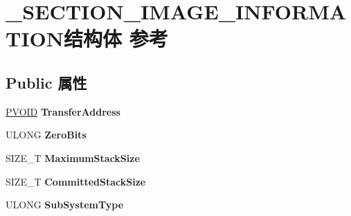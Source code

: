 \hypertarget{struct___s_e_c_t_i_o_n___i_m_a_g_e___i_n_f_o_r_m_a_t_i_o_n}{}\section{\+\_\+\+S\+E\+C\+T\+I\+O\+N\+\_\+\+I\+M\+A\+G\+E\+\_\+\+I\+N\+F\+O\+R\+M\+A\+T\+I\+O\+N结构体 参考}
\label{struct___s_e_c_t_i_o_n___i_m_a_g_e___i_n_f_o_r_m_a_t_i_o_n}
\subsection*{Public 属性}
\begin{DoxyCompactItemize}
\item 
\mbox{\label{struct___s_e_c_t_i_o_n___i_m_a_g_e___i_n_f_o_r_m_a_t_i_o_n_a0975ee9da48bc3965d6d0f975b2793c0}} 
\hyperlink{interfacevoid}{P\+V\+O\+ID} {\bfseries Transfer\+Address}
\item 
\mbox{\label{struct___s_e_c_t_i_o_n___i_m_a_g_e___i_n_f_o_r_m_a_t_i_o_n_a765c8f6cde427aed510e1ce530b07c0f}} 
U\+L\+O\+NG {\bfseries Zero\+Bits}
\item 
\mbox{\label{struct___s_e_c_t_i_o_n___i_m_a_g_e___i_n_f_o_r_m_a_t_i_o_n_aaef57a824f7a87ac9dcb719f26510f33}} 
S\+I\+Z\+E\+\_\+T {\bfseries Maximum\+Stack\+Size}
\item 
\mbox{\label{struct___s_e_c_t_i_o_n___i_m_a_g_e___i_n_f_o_r_m_a_t_i_o_n_a804226882c44adeef7ec203c99fc97de}} 
S\+I\+Z\+E\+\_\+T {\bfseries Committed\+Stack\+Size}
\item 
\mbox{\label{struct___s_e_c_t_i_o_n___i_m_a_g_e___i_n_f_o_r_m_a_t_i_o_n_abb39d508e2e9cbdc030f6ec82cad63b5}} 
U\+L\+O\+NG {\bfseries Sub\+System\+Type}
\item 
\mbox{\label{struct___s_e_c_t_i_o_n___i_m_a_g_e___i_n_f_o_r_m_a_t_i_o_n_ad63f4ad45f39b8f8e31b84824d8147d3}} 

\end{DoxyCompactItemize}
